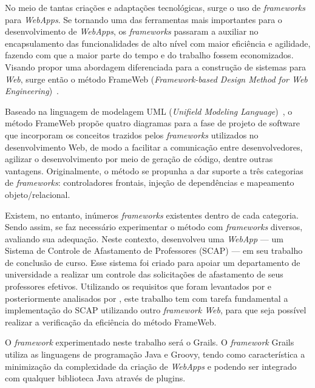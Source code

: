 No meio de tantas criações e adaptações tecnológicas, surge o uso de \textit{frameworks} para \textit{WebApps}. Se tornando uma das ferramentas mais importantes para o desenvolvimento de \textit{WebApps}, os \textit{frameworks} passaram a auxiliar no encapsulamento das funcionalidades de alto nível com maior eficiência e agilidade, fazendo com que a maior parte do tempo e do trabalho fossem economizados. Visando propor uma abordagem diferenciada para a construção de sistemas para \textit{Web}, surge então o método FrameWeb (\textit{Framework-based Design Method for Web Engineering})~\cite{souza:masterthesis07,souza-celebratingfalbo20}. %

Baseado na linguagem de modelagem UML (\textit{Unifield Modeling Language})~\cite{booch-et-al:u06}, o método FrameWeb propõe quatro diagramas para a fase de projeto de software que incorporam os conceitos trazidos pelos \textit{frameworks} utilizados no desenvolvimento Web, de modo a facilitar a comunicação entre desenvolvedores, agilizar o desenvolvimento por meio de geração de código, dentre outras vantagens. Originalmente, o método se propunha a dar suporte a três categorias de \textit{frameworks}: controladores frontais, injeção de dependências e mapeamento objeto/relacional.

Existem, no entanto, inúmeros \textit{frameworks} existentes dentro de cada categoria. Sendo assim, se faz necessário experimentar o método com \textit{frameworks} diversos, avaliando sua adequação. Neste contexto,  desenvolveu uma \textit{WebApp} --- um Sistema de Controle de Afastamento de Professores (SCAP) --- em seu trabalho de conclusão de curso. Esse sistema foi criado para apoiar um departamento de universidade a realizar um controle das solicitações de afastamento de seus professores efetivos. Utilizando os requisitos que foram levantados por  e posteriormente analisados por , este trabalho tem com tarefa fundamental a implementação do SCAP utilizando outro \textit{framework Web}, para que seja possível realizar a verificação da eficiência do método FrameWeb.

O \textit{framework} experimentado neste trabalho será o Grails. O \textit{framework} Grails utiliza as linguagens de programação Java e Groovy, tendo como característica a minimização da complexidade da criação de \textit{WebApps} e podendo ser integrado com qualquer biblioteca Java através de plugins.


